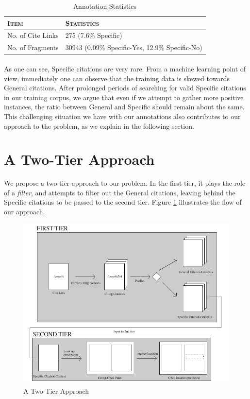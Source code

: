\begin{table}[h]
	\center
	\begin{tabular}{ l | l}
		\textsc{Item} & \textsc{Statistics}\\
		\hline
		No. of Cite Links & 275 (7.6\% Specific) \\
		No. of Fragments & 30943 (0.09\% Specific-Yes, 12.9\% Specific-No)
	\end{tabular}
	\caption{Annotation Statistics}
	\label{tab:annotation}
\end{table}

\paragraph{}
As one can see, Specific citations are very rare. From a machine learning point of view, immediately one can observe that the training data is skewed towards General citations. After prolonged periods of searching for valid Specific citations in our training corpus, we argue that even if we attempt to gather more positive instances, the ratio between General and Specific should remain about the same. This challenging situation we have with our annotations also contributes to our approach to the problem, as we explain in the following section.

\section{A Two-Tier Approach}
\paragraph{}
We propose a two-tier approach to our problem. In the first tier, it plays the role of a \textit{filter}, and attempts to filter out the General citations, leaving behind the Specific citations to be passed to the second tier. Figure \ref{fig:twotier} illustrates the flow of our approach.
\begin{figure}[h]
  \centering
  \includegraphics[scale=0.60]{./twotier}
  \caption{A Two-Tier Approach}
  \label{fig:twotier}
\end{figure}

